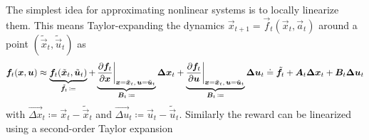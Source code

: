 		The simplest idea for approximating nonlinear systems is to locally linearize them. This means Taylor-expanding the dynamics \( \vec{x}_{t + 1} = \vec{f}_t(\vec{x}_t, \vec{a}_t) \) around a point \( (\tilde{\vec{x}}_t, \tilde{\vec{u}}_t) \) as
		\begin{equation*}
			\bm{f}_t(\bm{x}, \bm{u})
			\approx \underbrace{\bm{f}_t(\tilde{\bm{x}}_t, \tilde{\bm{u}}_t)}_{\tilde{\bm{f}}_t \,\coloneqq}
			+ \underbrace{\pdv{\bm{f}_t}{\bm{x}} \bigg\vert_{\bm{x} = \tilde{\bm{x}}_t,\, \bm{u} = \tilde{\bm{u}}_t}}_{\bm{B}_t \,\coloneqq} \bm{\Delta x}_t
			+ \underbrace{\pdv{\bm{f}_t}{\bm{u}} \bigg\vert_{\bm{x} = \tilde{\bm{x}}_t,\, \bm{u} = \tilde{\bm{u}}_t}}_{\bm{B}_t \,\coloneqq} \bm{\Delta u}_t
			\doteq \tilde{\bm{f}}_t + \bm{A}_t \bm{\Delta x}_t + \bm{B}_t \bm{\Delta u}_t
		\end{equation*}
		with \( \vec{\Delta x}_t \coloneqq \vec{x}_t - \tilde{\vec{x}}_t \) and \( \vec{\Delta u}_t \coloneqq \vec{u}_t - \tilde{\vec{u}}_t \). Similarly the reward can be linearized using a second-order Taylor expansion
